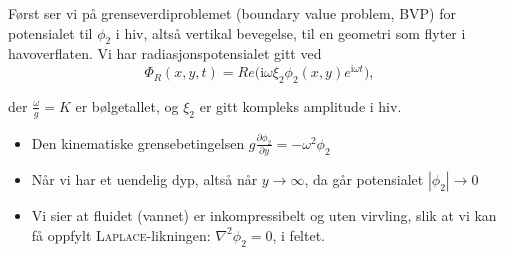 Først ser vi på grenseverdiproblemet (boundary value problem, BVP) for potensialet til $\phi_2$ i hiv, altså vertikal bevegelse, til en geometri som flyter i havoverflaten. Vi har radiasjonspotensialet gitt ved
\begin{equation}
\Phi_R(x,y,t) = Re\Big( \mathrm{i} \omega \xi_2 \phi_2(x,y) e^{\mathrm{i} \omega t} \Big), 
\end{equation}

der $\frac{\omega}{g} = K$ er bølgetallet, og $\xi_2$ er gitt kompleks amplitude i hiv.

%
\begin{itemize}
    \item Den kinematiske grensebetingelsen $g \frac{\partial \phi_2}{\partial y} = - \omega^2 \phi_2$
    

    \item Når vi har et uendelig dyp, altså når $y \rightarrow \infty$, da går potensialet $|\phi_2| \rightarrow 0$

    \item Vi sier at fluidet (vannet) er inkompressibelt og uten virvling, slik at vi kan få oppfylt \textsc{Laplace}-likningen: $\nabla^2 \phi_2 = 0$, i feltet.
\end{itemize}
